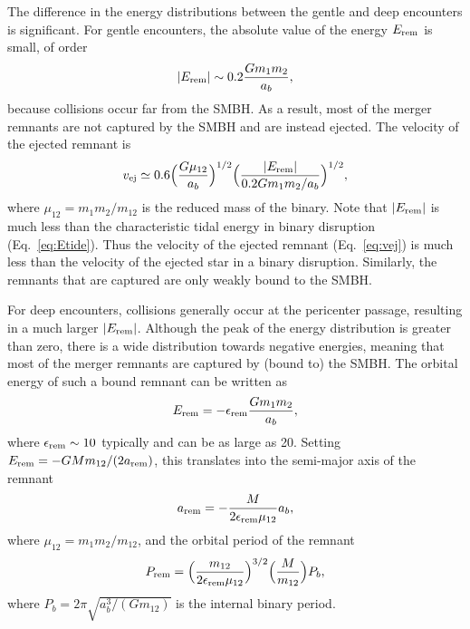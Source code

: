 \documentclass[twocolumn]{aastex631}
\begin{document}
The difference in the energy distributions between the gentle and deep encounters is significant.
For gentle encounters, the absolute value of the energy $E_{\rm rem}$ is small, of order 
\begin{equation}
   |E_{\rm rem}|\sim 0.2 \frac{Gm_1m_2}{a_b},
\end{equation}
because collisions occur far from the SMBH. 
As a result, most of the merger remnants are not captured by the SMBH and are instead ejected.
The velocity of the ejected remnant is
\begin{equation}
    v_{\rm ej} \simeq 0.6 \Bigl( \frac{G\mu_{12}}{a_b} \Bigr)^{1/2} \Bigl(\frac{|E_{\rm rem}|}{0.2Gm_1m_2/a_b} \Bigr)^{1/2},
\label{eq:vej}
\end{equation}
where $\mu_{12}=m_1m_2/m_{12}$ is the reduced mass of the binary.
Note that $|E_{\rm rem}|$ is much less than the characteristic tidal energy in binary disruption (Eq.~\ref{eq:Etide}).
Thus the velocity of the ejected remnant (Eq.~\ref{eq:vej}) is much less than the velocity of the ejected star in a binary disruption.
Similarly, the remnants that are captured are only weakly bound to the SMBH.

For deep encounters, collisions generally occur at the pericenter passage, resulting in a much larger $|E_{\rm rem}|$. 
Although the peak of the energy distribution is greater than zero, there is a wide distribution towards negative energies, meaning that most of the merger remnants are captured by (bound to) the SMBH. 
The orbital energy of such a bound remnant can be written as
\begin{equation}
    E_{\rm rem}= -\epsilon_{\rm rem}\frac{Gm_1m_2}{a_b},
   \label{eq:Erem}
\end{equation}
where $\epsilon_{\rm rem}\sim 10$ typically and can be as large as 20.  
Setting $E_{\rm rem}=-GMm_{12}/(2a_{\rm rem})$, this translates into the semi-major axis of the remnant
\begin{equation}
    a_{\rm rem}=-\frac{M}{2\epsilon_{\rm rem}\mu_{12}}a_b,
\label{eq:arem}
\end{equation}
where $\mu_{12}=m_1m_2/m_{12}$, and the orbital period of the remnant 
\begin{equation}
    P_{\rm rem}=\Bigl( \frac{m_{12}}{2\epsilon_{\rm rem}\mu_{12}} \Bigr)^{3/2} \Bigl( \frac{M}{m_{12}}\Bigr) P_b,
\label{eq:Prem_1}
\end{equation}
where $P_b=2\pi \sqrt{a_b^3/(Gm_{12})}$ is the internal binary period.
\end{document}
